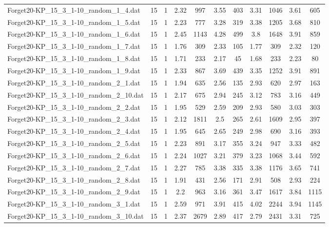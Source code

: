 \begin{table}[!ht]
\begin{tabular}{lcccccccccc}
Forget20-KP\_15\_3\_1-10\_random\_1\_4.dat & 15 & 1 & 2.32 & 997 & 3.55 & 403 & 3.31 & 1046 & 3.61 & 605 \\
Forget20-KP\_15\_3\_1-10\_random\_1\_5.dat & 15 & 1 & 2.23 & 777 & 3.28 & 319 & 3.38 & 1205 & 3.68 & 810 \\
Forget20-KP\_15\_3\_1-10\_random\_1\_6.dat & 15 & 1 & 2.45 & 1143 & 4.28 & 499 & 3.8 & 1648 & 3.91 & 859 \\
Forget20-KP\_15\_3\_1-10\_random\_1\_7.dat & 15 & 1 & 1.76 & 309 & 2.33 & 105 & 1.77 & 309 & 2.32 & 120 \\
Forget20-KP\_15\_3\_1-10\_random\_1\_8.dat & 15 & 1 & 1.71 & 233 & 2.17 & 45 & 1.68 & 233 & 2.23 & 80 \\
Forget20-KP\_15\_3\_1-10\_random\_1\_9.dat & 15 & 1 & 2.33 & 867 & 3.69 & 439 & 3.35 & 1252 & 3.91 & 891 \\
Forget20-KP\_15\_3\_1-10\_random\_2\_1.dat & 15 & 1 & 1.94 & 635 & 2.56 & 135 & 2.93 & 620 & 2.97 & 163 \\
Forget20-KP\_15\_3\_1-10\_random\_2\_10.dat & 15 & 1 & 2.17 & 675 & 2.94 & 245 & 3.12 & 783 & 3.16 & 449 \\
Forget20-KP\_15\_3\_1-10\_random\_2\_2.dat & 15 & 1 & 1.95 & 529 & 2.59 & 209 & 2.93 & 580 & 3.03 & 303 \\
Forget20-KP\_15\_3\_1-10\_random\_2\_3.dat & 15 & 1 & 2.12 & 1811 & 2.5 & 265 & 2.61 & 1609 & 2.95 & 397 \\
Forget20-KP\_15\_3\_1-10\_random\_2\_4.dat & 15 & 1 & 1.95 & 645 & 2.65 & 249 & 2.98 & 690 & 3.16 & 393 \\
Forget20-KP\_15\_3\_1-10\_random\_2\_5.dat & 15 & 1 & 2.23 & 891 & 3.17 & 355 & 3.24 & 947 & 3.33 & 482 \\
Forget20-KP\_15\_3\_1-10\_random\_2\_6.dat & 15 & 1 & 2.24 & 1027 & 3.21 & 379 & 3.23 & 1068 & 3.44 & 592 \\
Forget20-KP\_15\_3\_1-10\_random\_2\_7.dat & 15 & 1 & 2.27 & 785 & 3.38 & 335 & 3.38 & 1176 & 3.65 & 741 \\
Forget20-KP\_15\_3\_1-10\_random\_2\_8.dat & 15 & 1 & 1.91 & 431 & 2.56 & 171 & 2.91 & 508 & 2.93 & 224 \\
Forget20-KP\_15\_3\_1-10\_random\_2\_9.dat & 15 & 1 & 2.2 & 963 & 3.16 & 361 & 3.47 & 1617 & 3.84 & 1115 \\
Forget20-KP\_15\_3\_1-10\_random\_3\_1.dat & 15 & 1 & 2.59 & 971 & 3.91 & 415 & 4.02 & 2244 & 3.94 & 1145 \\
Forget20-KP\_15\_3\_1-10\_random\_3\_10.dat & 15 & 1 & 2.37 & 2679 & 2.89 & 417 & 2.79 & 2431 & 3.31 & 725 \\

\end{tabular}
\end{table}
